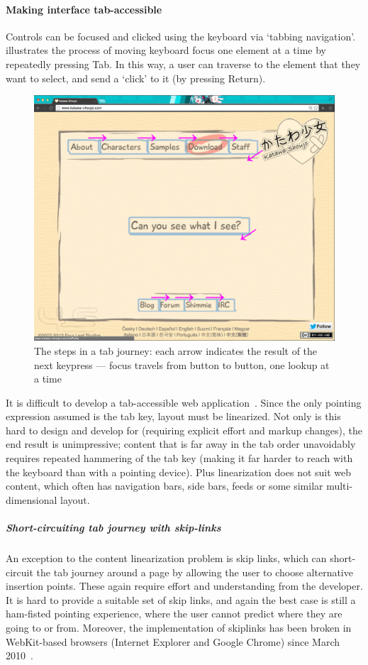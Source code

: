 \documentclass[11pt,openright,a4paper]{report}
\begin{document}
\paragraph{Making interface tab-accessible}
Controls can be focused and clicked using the keyboard via `tabbing navigation'.  illustrates the process of moving keyboard focus one element at a time by repeatedly pressing Tab. In this way, a user can traverse to the element that they want to select, and send a `click' to it (by pressing Return).

\begin{figure}[ht]
\centering\includegraphics[width=\textwidth]{figures/TabbingJourney.png}
\caption{The steps in a tab journey: each arrow indicates the result of the next keypress --- focus travels from button to button, one lookup at a time}
\label{fig:tabjourney}
\end{figure}

\FloatBarrier
   It is difficult to develop a tab-accessible web application~\cite{watanabe2012using}. Since the only pointing expression assumed is the tab key, layout must be linearized. Not only is this hard to design and develop for (requiring explicit effort and markup changes), the end result is unimpressive; content that is far away in the tab order unavoidably requires repeated hammering of the tab key (making it far harder to reach with the keyboard than with a pointing device). Plus linearization does not suit web content, which often has navigation bars, side bars, feeds or some similar multi-dimensional layout.
   \subparagraph{Short-circuiting tab journey with skip-links}
\label{sec:skiplinks}
  An exception to the content linearization problem is skip links, which can short-circuit the tab journey around a page by allowing the user to choose alternative insertion points. These again require effort and understanding from the developer. It is hard to provide a suitable set of skip links, and again the best case is still a ham-fisted pointing experience, where the user cannot predict where they are going to or from. Moreover, the implementation of skiplinks has been broken in WebKit-based browsers (Internet Explorer and Google Chrome) since March 2010~\cite{skiplinkbreak,skiplinkbreakarticle}.
\end{document}
